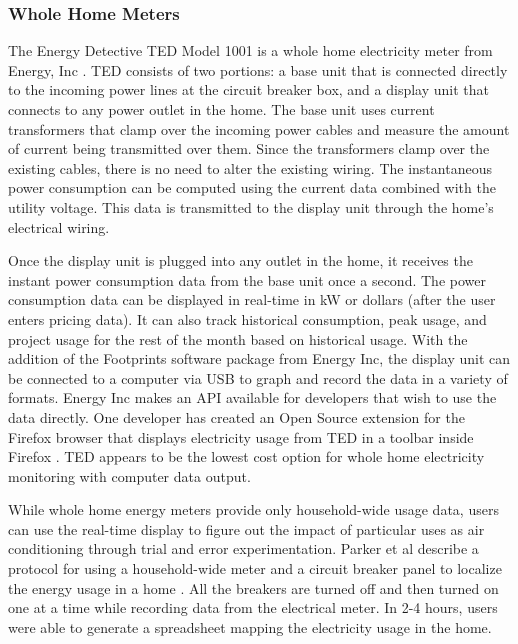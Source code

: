 \subsubsection{Whole Home Meters}
\label{whole-home-meters}

The Energy Detective TED Model 1001 is a whole home electricity meter from Energy, Inc \cite{the-energy-detective}. TED consists of two portions: a base unit that is connected directly to the incoming power lines at the circuit breaker box, and a display unit that connects to any power outlet in the home. The base unit uses current transformers that clamp over the incoming power cables and measure the amount of current being transmitted over them. Since the transformers clamp over the existing cables, there is no need to alter the existing wiring. The instantaneous power consumption can be computed using the current data combined with the utility voltage. This data is transmitted to the display unit through the home's electrical wiring.

Once the display unit is plugged into any outlet in the home, it receives the instant power consumption data from the base unit once a second. The power consumption data can be displayed in real-time in kW or dollars (after the user enters pricing data). It can also track historical consumption, peak usage, and project usage for the rest of the month based on historical usage. With the addition of the Footprints software package from Energy Inc, the display unit can be connected to a computer via USB to graph and record the data in a variety of formats. Energy Inc makes an API available for developers that wish to use the data directly. One developer has created an Open Source extension for the Firefox browser that displays electricity usage from TED in a toolbar inside Firefox \cite{Nick2008TED-the-Toolbar}. TED appears to be the lowest cost option for whole home electricity monitoring with computer data output.

While whole home energy meters provide only household-wide usage data, users can use the real-time display to figure out the impact of particular uses as air conditioning through trial and error experimentation. Parker et al describe a protocol for using a household-wide meter and a circuit breaker panel to localize the energy usage in a home \cite{Parker2006How-Much-Energy}. All the breakers are turned off and then turned on one at a time while recording data from the electrical meter. In 2-4 hours, users were able to generate a spreadsheet mapping the electricity usage in the home.

